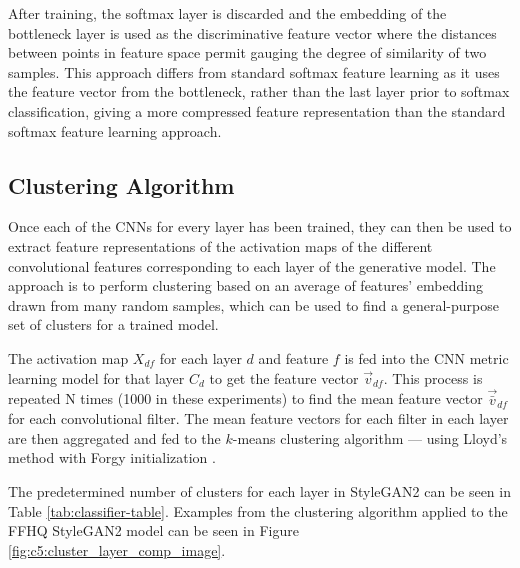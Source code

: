 After training, the softmax layer is discarded and the embedding of the bottleneck layer is used as the discriminative feature vector where the distances between points in feature space permit gauging the degree of similarity of two samples. 
This approach differs from standard softmax feature learning as it uses the feature vector from the bottleneck, rather than the last layer prior to softmax classification, giving a more compressed feature representation than the standard softmax feature learning approach.

\subsection{Clustering Algorithm}

\label{c5:sec:clustering}

Once each of the CNNs for every layer has been trained, they can then be used to extract feature representations of the activation maps of the different convolutional features corresponding to each layer of the generative model.
The approach is to perform clustering based on an average of features' embedding drawn from many random samples, which can be used to find a general-purpose set of clusters for a trained model.

The activation map $X_{df}$ for each layer $d$ and feature $f$ is fed into the CNN metric learning model for that layer $C_d$ to get the feature vector $\vec{v}_{df}$. 
This process is repeated N times (1000 in these experiments) to find the mean feature vector $\vec{\bar{v}}_{df}$ for each convolutional filter.
The mean feature vectors for each filter in each layer are then aggregated and fed to the $k$-means clustering algorithm --- using Lloyd's method \citep{lloyd1982least} with Forgy initialization \citep{forgy1965cluster, celebi2013comparative}. 

The predetermined number of clusters for each layer in StyleGAN2 can be seen in Table \ref{tab:classifier-table}. 
Examples from the clustering algorithm applied to the FFHQ StyleGAN2 model can be seen in Figure \ref{fig:c5:cluster_layer_comp_image}.

